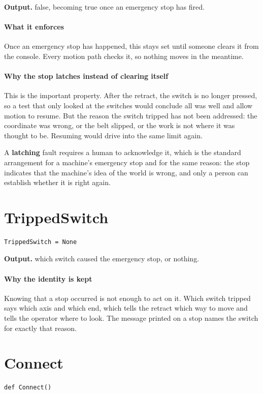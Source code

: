 \noindent\textbf{Output.} false, becoming true once an emergency stop has fired.


\paragraph{What it enforces}
Once an emergency stop has happened, this stays set until someone clears it from the console. Every motion path checks it, so nothing moves in the meantime.


\paragraph{Why the stop latches instead of clearing itself}
This is the important property. After the retract, the switch is no longer pressed, so a test that only looked at the switches would conclude all was well and allow motion to resume. But the reason the switch tripped has not been addressed: the coordinate was wrong, or the belt slipped, or the work is not where it was thought to be. Resuming would drive into the same limit again.

A \textbf{latching} fault requires a human to acknowledge it, which is the standard arrangement for a machine's emergency stop and for the same reason: the stop indicates that the machine's idea of the world is wrong, and only a person can establish whether it is right again.


\section{TrippedSwitch}
\begin{lstlisting}[style=sig]
TrippedSwitch = None
\end{lstlisting}

\noindent\textbf{Output.} which switch caused the emergency stop, or nothing.


\paragraph{Why the identity is kept}
Knowing that a stop occurred is not enough to act on it. Which switch tripped says which axis and which end, which tells the retract which way to move and tells the operator where to look. The message printed on a stop names the switch for exactly that reason.


\section{Connect}
\begin{lstlisting}[style=sig]
def Connect()
\end{lstlisting}

